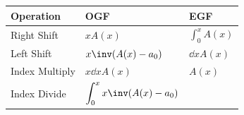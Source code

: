 \begin{longtable}[]{@{}lll@{}}
\toprule
\begin{minipage}[b]{0.30\columnwidth}\raggedright
Operation\strut
\end{minipage} & \begin{minipage}[b]{0.30\columnwidth}\raggedright
OGF\strut
\end{minipage} & \begin{minipage}[b]{0.30\columnwidth}\raggedright
EGF\strut
\end{minipage}\tabularnewline
\midrule
\endhead
\begin{minipage}[t]{0.30\columnwidth}\raggedright
Right Shift\strut
\end{minipage} & \begin{minipage}[t]{0.30\columnwidth}\raggedright
\(xA(x)\)\strut
\end{minipage} & \begin{minipage}[t]{0.30\columnwidth}\raggedright
\(\displaystyle\int_0^x A(x)\)\strut
\end{minipage}\tabularnewline
\begin{minipage}[t]{0.30\columnwidth}\raggedright
Left Shift\strut
\end{minipage} & \begin{minipage}[t]{0.30\columnwidth}\raggedright
\(x\inv (A(x) - a_0)\)\strut
\end{minipage} & \begin{minipage}[t]{0.30\columnwidth}\raggedright
\(\dd{}{x} A(x)\)\strut
\end{minipage}\tabularnewline
\begin{minipage}[t]{0.30\columnwidth}\raggedright
Index Multiply\strut
\end{minipage} & \begin{minipage}[t]{0.30\columnwidth}\raggedright
\(x\dd{}{x}A(x)\)\strut
\end{minipage} & \begin{minipage}[t]{0.30\columnwidth}\raggedright
\(A(x)\)\strut
\end{minipage}\tabularnewline
\begin{minipage}[t]{0.30\columnwidth}\raggedright
Index Divide\strut
\end{minipage} & \begin{minipage}[t]{0.30\columnwidth}\raggedright
\(\displaystyle\int_0^x x\inv (A(x) - a_0)\)\strut
\end{minipage} & \begin{minipage}[t]{0.30\columnwidth}\raggedright

\end{minipage}
\end{longtable}
